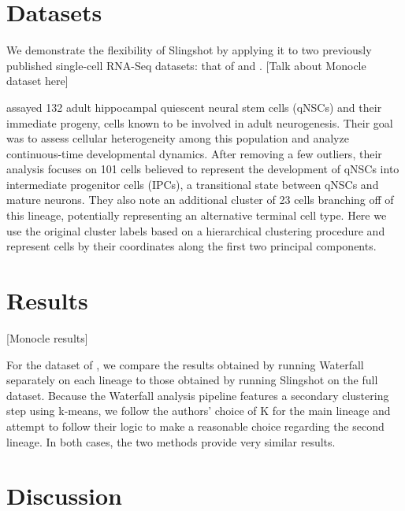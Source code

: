 \documentclass[11pt]{article}\usepackage[]{graphicx}\usepackage[]{color}
\begin{document}
\section{Datasets}
We demonstrate the flexibility of Slingshot by applying it to two previously published single-cell RNA-Seq datasets: that of \citet{Trapnelletal14} and \citet{Shinetal15}. [Talk about Monocle dataset here]

\citet{Shinetal15} assayed 132 adult hippocampal quiescent neural stem cells (qNSCs) and their immediate progeny, cells known to be involved in adult neurogenesis. Their goal was to assess cellular heterogeneity among this population and analyze continuous-time developmental dynamics. After removing a few outliers, their analysis focuses on 101 cells believed to represent the development of qNSCs into intermediate progenitor cells (IPCs), a transitional state between qNSCs and mature neurons. They also note an additional cluster of 23 cells branching off of this lineage, potentially representing an alternative terminal cell type. Here we use the original cluster labels based on a hierarchical clustering procedure and represent cells by their coordinates along the first two principal components.

\section{Results}
[Monocle results]

For the dataset of \citet{Shinetal15}, we compare the results obtained by running Waterfall separately on each lineage to those obtained by running Slingshot on the full dataset. Because the Waterfall analysis pipeline features a secondary clustering step using k-means, we follow the authors' choice of K for the main lineage and attempt to follow their logic to make a reasonable choice regarding the second lineage. In both cases, the two methods provide very similar results.

\section{Discussion}


\end{document}
